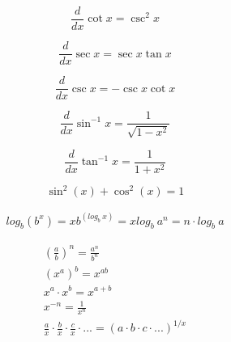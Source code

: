 \documentclass[12pt, english]{article}
\begin{document}
\noindent
{}
\begin{equation}
	\frac{d}{dx} \cot x = \csc^2 x
\end{equation}

\noindent
{}
\begin{equation}
	\frac{d}{dx} \sec x = \sec x \tan x
\end{equation}

\noindent
{}
\begin{equation} 
	\frac{d}{dx} \csc x = -\csc x \cot x
\end{equation}

\noindent
{}
\begin{equation}
	\frac{d}{dx} \sin^{-1} x = \frac{1}{\sqrt{1-x^2}}
\end{equation}

\noindent
{}
\begin{equation}
	\frac{d}{dx} \tan^{-1} x = \frac{1}{1+x^2}
\end{equation}

\noindent
{}
\begin{equation}
	\sin ^{2}(x)+\cos ^{2}(x)=1
\end{equation}

\noindent
{}
\begin{equation}
	\begin{aligned}
		log_b (b^x) = x
		b^{(log_{b}\ x)} = x
		log_{b}\ a^n = n \cdot log_b\ a
	\end{aligned}
\end{equation}

\noindent
{}
\begin{equation}
	\begin{aligned}
		\left(\frac{a}{b}\right)^n = \frac{a^n}{b^n} \\
		(x^a)^b = x^{ab} \\
		x^a \cdot x^b = x^{a + b} \\
		x^{-n} = \frac{1}{x^n} \\
		\frac{a}{x} \cdot \frac{b}{x} \cdot \frac{c}{x} \cdot ... = (a \cdot b \cdot c \cdot ...)^{1/x} \\
	\end{aligned}
\end{equation}
\end{document}
